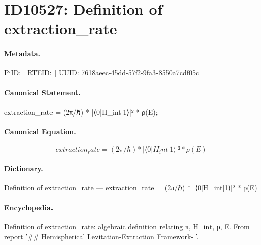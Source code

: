 \section*{ID10527: Definition of extraction\_rate}
\paragraph{Metadata.}
PiID:  | RTEID:  | UUID: 7618aeec-45dd-57f2-9fa3-8550a7cdf05c

\paragraph{Canonical Statement.}
extraction\_rate = (2π/ℏ) * |⟨0|H\_int|1⟩|² * ρ(E);

\paragraph{Canonical Equation.}
\[
extraction_rate = (2π/ℏ) * |⟨0|H_int|1⟩|² * ρ(E)
\]

\paragraph{Dictionary.}
Definition of extraction\_rate — extraction\_rate = (2π/ℏ) * |⟨0|H\_int|1⟩|² * ρ(E)

\paragraph{Encyclopedia.}
Definition of extraction\_rate: algebraic definition relating π, H\_int, ρ, E. From report '\#\# Hemispherical Levitation-Extraction Framework- '.
